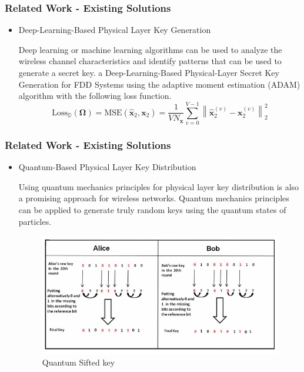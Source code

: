 \documentclass{beamer}
\begin{document}
\begin{frame}
  \frametitle{Related Work - Existing Solutions}
  \begin{itemize}
    \item Deep-Learning-Based Physical Layer Key Generation\cite{9526766}
    
    Deep learning or machine learning algorithms can be used to analyze the wireless channel characteristics and identify patterns that can be used to generate a secret key.
    a Deep-Learning-Based Physical-Layer Secret Key Generation for FDD Systems using the adaptive moment estimation (ADAM) algorithm with the following loss function\cite{9526766}. 
\begin{equation} {\mathrm{ Loss}}_{\mathbb {D}}\left ({\boldsymbol {\Omega }}\right) = {\mathrm{ MSE}}\left ({\widehat {\mathbf {x}}_{2}, \mathbf {x}_{2}}\right)=\frac {1}{VN_{\mathbf {x}}}\sum _{v=0}^{V-1}\left \|{\widehat {\mathbf {x}}_{2}^{\left ({v}\right)} -\mathbf {x}_{2}^{\left ({v}\right)}}\right \|_{2}^{2}\end{equation} 

\end{itemize}
\end{frame}

\begin{frame}
  \frametitle{Related Work - Existing Solutions}
  \begin{itemize}
    \item Quantum-Based Physical Layer Key Distribution
    
    Using quantum mechanics principles for physical layer key distribution is also a promising approach for wireless networks. Quantum mechanics principles can be applied to generate truly random keys using the quantum states of particles. 
    \begin{figure}
      \centering
      \includegraphics[width=0.6\linewidth]{figures/quantum.png}
      \caption{Quantum Sifted key\cite{10.1145/3546869}}
      \label{fig:quantum}
    \end{figure}
\end{itemize}
\end{frame}
\end{document}
